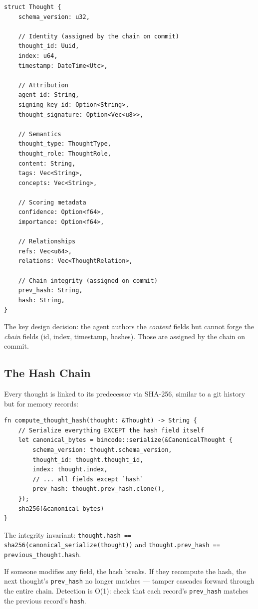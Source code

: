 \documentclass[11pt,a4paper]{article}
\begin{document}
\begin{lstlisting}
struct Thought {
    schema_version: u32,

    // Identity (assigned by the chain on commit)
    thought_id: Uuid,
    index: u64,
    timestamp: DateTime<Utc>,

    // Attribution
    agent_id: String,
    signing_key_id: Option<String>,
    thought_signature: Option<Vec<u8>>,

    // Semantics
    thought_type: ThoughtType,
    thought_role: ThoughtRole,
    content: String,
    tags: Vec<String>,
    concepts: Vec<String>,

    // Scoring metadata
    confidence: Option<f64>,
    importance: Option<f64>,

    // Relationships
    refs: Vec<u64>,
    relations: Vec<ThoughtRelation>,

    // Chain integrity (assigned on commit)
    prev_hash: String,
    hash: String,
}
\end{lstlisting}

The key design decision: the agent authors the \emph{content} fields but cannot forge the
\emph{chain} fields (id, index, timestamp, hashes). Those are assigned by the chain on commit.

\subsection{The Hash Chain}

Every thought is linked to its predecessor via SHA-256, similar to a git history but for
memory records:

\begin{lstlisting}
fn compute_thought_hash(thought: &Thought) -> String {
    // Serialize everything EXCEPT the hash field itself
    let canonical_bytes = bincode::serialize(&CanonicalThought {
        schema_version: thought.schema_version,
        thought_id: thought.thought_id,
        index: thought.index,
        // ... all fields except `hash`
        prev_hash: thought.prev_hash.clone(),
    });
    sha256(&canonical_bytes)
}
\end{lstlisting}

The integrity invariant: \texttt{thought.hash == sha256(canonical\_serialize(thought))}
and \texttt{thought.prev\_hash == previous\_thought.hash}.

If someone modifies any field, the hash breaks. If they recompute the hash, the next
thought's \texttt{prev\_hash} no longer matches — tamper cascades forward through the
entire chain. Detection is O(1): check that each record's \texttt{prev\_hash} matches the
previous record's \texttt{hash}.
\end{document}
